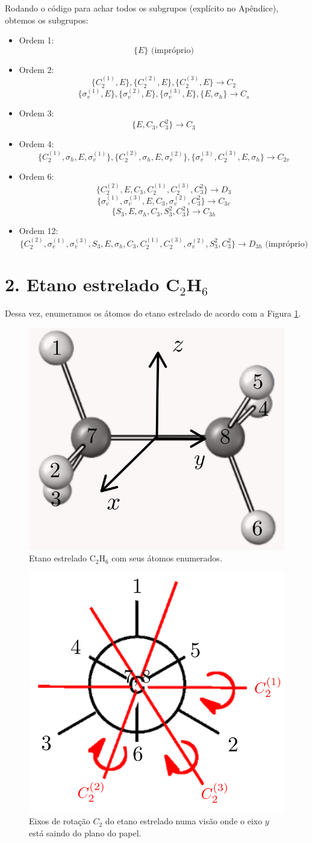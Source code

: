 \documentclass[a4paper,10pt]{article}
\begin{document}
\n

Rodando o código para achar todos os subgrupos (explícito no Apêndice), obtemos os subgrupos:

\begin{itemize}
\item Ordem 1:
$$
\{ E \} \text{ (impróprio)}
$$
\item Ordem 2:
$$
\{ C_2^{(1)}, E \} , \{ C_2^{(2)}, E \} , \{ C_2^{(3)}, E \} \to C_2
$$
$$
\{ \sigma_v^{(1)}, E \}, \{ \sigma_v^{(2)}, E \} , \{ \sigma_v^{(3)}, E \}, \{ E, \sigma_h \} \to C_s
$$
\item Ordem 3:
$$
\{ E, C_3, C_3^2 \} \to C_3
$$
\item Ordem 4:
$$
\{ C_2^{(1)}, \sigma_h, E, \sigma_v^{(1)} \} , \{ C_2^{(2)}, \sigma_h, E, \sigma_v^{(2)} \} , \{ \sigma_v^{(3)}, C_2^{(3)}, E, \sigma_h \} \to C_{2v}
$$
\item Ordem 6:
$$
\{ C_2^{(2)}, E, C_3, C_2^{(1)}, C_2^{(3)}, C_3^2 \} \to D_3
$$
$$
\{ \sigma_v^{(1)}, \sigma_v^{(3)}, E, C_3, \sigma_v^{(2)}, C_3^2 \} \to C_{3v}
$$
$$
\{ S_3, E, \sigma_h, C_3, S_3^2, C_3^2 \} \to C_{3h}
$$
\item Ordem 12:
$$
\{ C_2^{(2)}, \sigma_v^{(1)}, \sigma_v^{(3)}, S_3, E, \sigma_h, C_3, C_2^{(1)}, C_2^{(3)}, \sigma_v^{(2)}, S_3^2, C_3^2 \} \to D_{3h} \text{ (impróprio)}
$$
\end{itemize}


\pagebreak

\section*{2. Etano estrelado C$_2$H$_6$}

Dessa vez, enumeramos os átomos do etano estrelado de acordo com a Figura \ref{fig:etano_estrelado}.

\begin{figure}[H]
\centering
\includegraphics[width=0.3\linewidth]{fig/etano_estrelado.png}
\caption{Etano estrelado C$_2$H$_6$ com seus átomos enumerados.}
\label{fig:etano_estrelado}
\end{figure}

\begin{figure}[H]
\centering
\includegraphics[width=0.3\linewidth]{fig/C2_estrelado.png}
\caption{Eixos de rotação $C_2$ do etano estrelado numa visão onde o eixo $y$ está saindo do plano do papel.}
\label{fig:C2_estrelado}
\end{figure}
\end{document}
